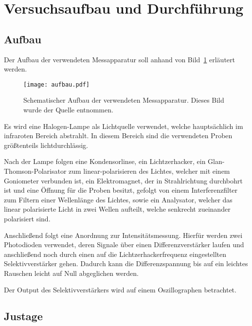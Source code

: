 
\section{Versuchsaufbau und Durchführung}
\subsection{Aufbau}
%

Der Aufbau der verwendeten Messapparatur soll anhand von 
Bild~\ref{fig:aufbau} erläutert werden.

\begin{figure}
\centering
\texttt{[image: aufbau.pdf]}
\caption{Schematischer Aufbau der verwendeten Messapparatur. 
Dieses Bild wurde der Quelle \cite{v046} entnommen.}
\label{fig:aufbau}
\end{figure}

Es wird eine Halogen-Lampe als Lichtquelle verwendet, welche 
hauptsächlich im infraroten Bereich abstrahlt. In diesem Bereich 
sind die verwendeten Proben größtenteils lichtdurchlässig.

Nach der Lampe folgen eine Kondensorlinse, ein Lichtzerhacker, 
ein Glan-Thomson-Polarisator zum linear-polarisieren des Lichtes, 
welcher mit einem Goniometer verbunden ist, ein Elektromagnet, 
der in Strahlrichtung durchbohrt ist und eine Öffnung für die Proben 
besitzt, gefolgt von einem Interferenzfilter zum Filtern einer 
Wellenlänge des Lichtes, sowie ein Analysator, welcher das 
linear polarisierte Licht in zwei Wellen aufteilt, welche 
senkrecht zueinander polarisiert sind.

Anschließend folgt eine Anordnung zur Intensitätsmessung. 
Hierfür werden zwei Photodioden verwendet, deren Signale 
über einen Differenzverstärker laufen und anschließend 
noch durch einen auf die Lichtzerhackerfrequenz eingestellten 
Selektivverstärker gehen. Dadurch kann die Differenzspannung 
bis auf ein leichtes Rauschen leicht auf Null abgeglichen werden.

Der Output des Selektivverstärkers wird auf einem Oszillographen betrachtet.

%
\subsection{Justage}
%

